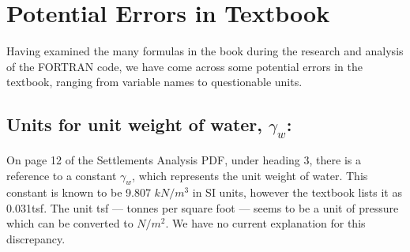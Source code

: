 \documentclass[11pt,fleqn]{article}
\newcommand{\indentpar}{\phantom{=}}
\begin{document}
    \section*{Potential Errors in Textbook}
    \indentpar Having examined the many formulas in the book during the research and 
    analysis of the FORTRAN code, we have come across some potential errors in the
    textbook, ranging from variable names to questionable units.
    \subsection*{Units for unit weight of water, $\gamma_w$:} 
    \indentpar On page 12 of the Settlements Analysis PDF, 
    under heading \(3\), there is a reference to a constant $\gamma_w$, 
    which represents the unit weight of water. This constant is known
    to be 9.807 $kN/m^3$ in SI units, however the textbook lists it as 
    0.031tsf. The unit tsf — tonnes per square foot — seems to be a unit
    of pressure which can be converted to $N/m^2$. We have no current 
    explanation for this discrepancy.
     
\end{document}
